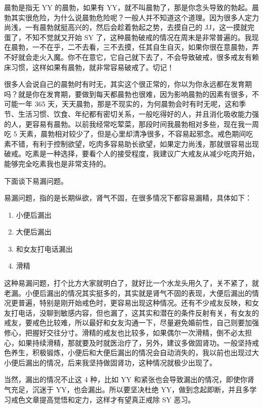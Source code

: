 \documentclass[fontset=founder]{ctexart}
\begin{document}
晨勃是指无 YY 的晨勃，如果有 YY，就不叫晨勃了，那是你念头导致的勃起。晨勃其实很危险，为什么说晨勃危险呢？一般人并不知道这个道理。因为很多人定力尚浅，一有晨勃就挺高兴的，然后会趁着勃起之势，去摸自己的 JJ，这一摸就完蛋了，不知不觉就又开始 SY 了，这种晨勃破戒的情况在周末是非常普遍的。我现在晨勃，一不在乎，二不去看，三不去摸，任其自生自灭，如果你很在意晨勃，弄不好就会走火入魔。你不在意它，它自己就下去了，不会导致破戒，很多戒友有赖床习惯，这样如果有晨勃，就非常容易破戒了。切记！

很多人会说自己的晨勃时有时无，其实这个很正常的，你以为你永远都在发育期吗？就是你在发育期，要做到每天都晨勃也很难，因为影响晨勃的因素有很多，不可能一年 365 天，天天晨勃，那是不现实的，为何晨勃会时有时无呢，这和季节、生活习惯、饮食、年纪都有密切关系，一般吃得好的人，并且消化吸收能力强的人，更容易有晨勃。以前我经常吃荤菜，那段时间我晨勃相对多些，现在我一周吃 5 天素，晨勃相对较少了，但是心里却清净很多，不容易起邪念。戒色期间吃素不错，有利于控制欲望，吃肉多容易助长欲望，如果定力尚浅，那就很容易出现破戒。吃素是一种选择，要看个人的接受程度，我建议广大戒友从减少吃肉开始，能够完全吃素我也是非常支持的。

下面谈下易漏问题。

易漏问题，指的是长期纵欲，肾气不固，在很多情况下都容易漏精，具体如下：

\begin{enumerate}
    \item 小便后漏出
    \item 大便后漏出
    \item 和女友打电话漏出
    \item 滑精
\end{enumerate}

这种易漏问题，打个比方大家就明白了，就好比一个水龙头用久了，关不紧了，就老漏。小便后漏出的情况其实挺多的，其实就是肾气不固的表现，大便后漏出的情况更普遍，特别是刚开始戒色时，更容易出现这种情况。还有不少戒友反映，和女友打电话，没聊到敏感内容，但也漏了，这其实和潜在的条件反射有关，有女友的戒友，要戒色比较难，所以最好和女友沟通一下，尽量避免婚前性，自己则要加强修心，把握好交往分寸。滑精的戒友也比较多，如果偶尔一次滑精，倒不必太担心，如果持续滑精，那就要及时就医治疗了，另外，建议多做固肾功。一般坚持戒色养生，积极锻炼，小便后和大便后漏出的情况会自动消失的，我以前也出现过大小便后漏出的情况，后来我坚持做固肾功，这种情况就极少出现了。

当然，漏出的情况不止这 4 种，比如 YY 和紧张也会导致漏出的情况，即使你肾气充足，沉迷于 YY，也会漏出。所以要坚决杜绝 YY，做到念起即断，并且多学习戒色文章提高觉悟和定力，这样才有望真正戒除 SY 恶习。
\end{document}

